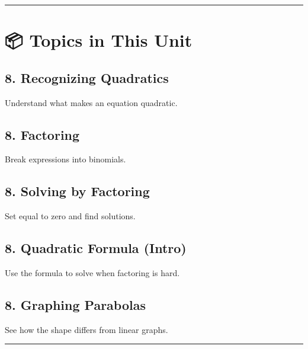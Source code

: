 \documentclass[
  letterpaper,
]{scrrept}
\begin{document}
\begin{center}\rule{0.5\linewidth}{0.5pt}\end{center}

\section*{📦 Topics in This Unit}\label{topics-in-this-unit-6}


\subsection*{8. Recognizing Quadratics}\label{recognizing-quadratics}

Understand what makes an equation quadratic.

\subsection*{8. Factoring}\label{factoring}

Break expressions into binomials.

\subsection*{8. Solving by Factoring}\label{solving-by-factoring}

Set equal to zero and find solutions.

\subsection*{8. Quadratic Formula
(Intro)}\label{quadratic-formula-intro}

Use the formula to solve when factoring is hard.

\subsection*{8. Graphing Parabolas}\label{graphing-parabolas}

See how the shape differs from linear graphs.

\begin{center}\rule{0.5\linewidth}{0.5pt}\end{center}
\end{document}
